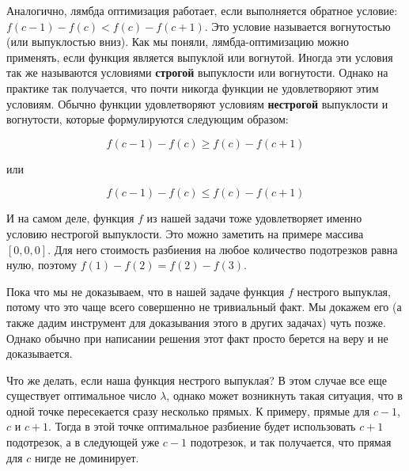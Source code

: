 Аналогично, лямбда оптимизация работает, если выполняется обратное условие: $f(c - 1) - f(c) < f(c) - f(c + 1)$. Это условие называется вогнутостью (или выпуклостью вниз). Как мы поняли, лямбда-оптимизацию можно применять, если функция является выпуклой или вогнутой. Иногда эти условия так же называются условиями \textbf{строгой} выпуклости или вогнутости. Однако на практике так получается, что почти никогда функции не удовлетворяют этим условиям.
Обычно функции удовлетворяют условиям \textbf{нестрогой} выпуклости и вогнутости, которые формулируются следующим образом:

$$f(c - 1) - f(c) \ge f(c) - f(c + 1)$$

или

$$f(c - 1) - f(c) \le f(c) - f(c + 1)$$

И на самом деле, функция $f$ из нашей задачи тоже удовлетворяет именно условию нестрогой выпуклости. Это можно заметить на примере массива $[0, 0, 0]$. Для него стоимость разбиения на любое количество подотрезков равна нулю, поэтому $f(1) - f(2) = f(2) - f(3)$.

\begin{observation}
    Пока что мы не доказываем, что в нашей задаче функция $f$ нестрого выпуклая, потому что это чаще всего совершенно не тривиальный факт. Мы докажем его (а также дадим инструмент для доказывания этого в других задачах) чуть позже. Однако обычно при написании решения этот факт просто берется на веру и не доказывается.
\end{observation}

Что же делать, если наша функция нестрого выпуклая? В этом случае все еще существует оптимальное число $\lambda$, однако может возникнуть такая ситуация, что в одной точке пересекается сразу несколько прямых. К примеру, прямые для $c - 1$, $c$ и $c + 1$. Тогда в этой точке оптимальное разбиение будет использовать $c + 1$ подотрезок, а в следующей уже $c - 1$ подотрезок, и так получается, что прямая для $c$ нигде не доминирует.

